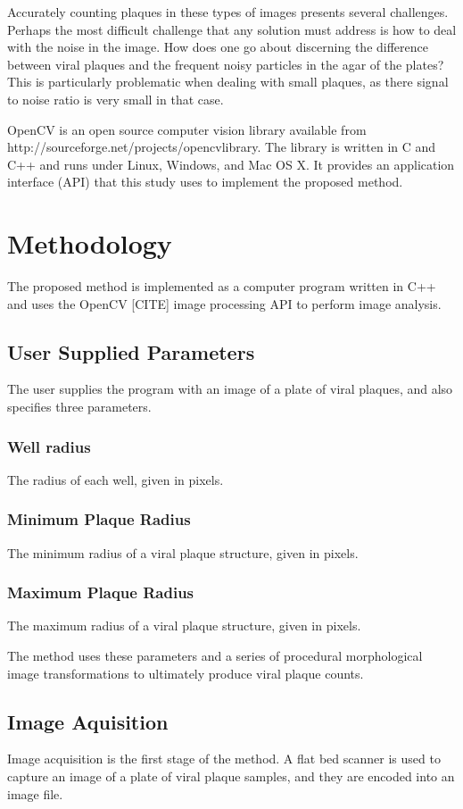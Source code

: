 \documentclass[11pt,final,twocolumn]{IEEEtran}
\begin{document}
Accurately counting plaques in these types of images presents several challenges. Perhaps the most difficult challenge that any solution must address is how to deal with the noise in the image.  How does one go about discerning the difference between viral plaques and the frequent noisy particles in the agar of the plates?  This is particularly problematic when dealing with small plaques, as there signal to noise ratio is very small in that case.  

OpenCV is an open source computer vision library available from http://sourceforge.net/projects/opencvlibrary. The library is written in C and C++ and runs under Linux, Windows, and Mac OS X. It provides an application interface (API) that this study uses to implement the proposed method. 


\section{Methodology}
The proposed method is implemented as a computer program written in C++ and uses the  OpenCV [CITE] image processing API to perform image analysis. 

\subsection{User Supplied Parameters}
The user supplies the program with an image of a plate of viral plaques, and also specifies three parameters.
\subsubsection{Well radius}
The radius of each well, given in pixels.

\subsubsection{Minimum Plaque Radius}
 The minimum radius of a viral plaque structure, given in pixels.

\subsubsection{Maximum Plaque Radius}
 The maximum radius of a viral plaque structure, given in pixels.


The method uses these parameters and a series of procedural morphological image transformations to ultimately produce viral plaque counts.

\subsection{Image Aquisition}
Image acquisition  is the first stage of the method. A flat bed scanner is used to capture an image of a plate of viral plaque samples, and they are encoded into an image file. 
\end{document}
